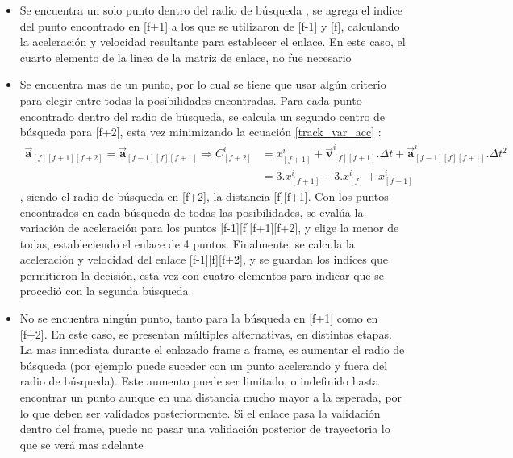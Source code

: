 \begin{itemize}
\item Se encuentra un solo punto dentro del radio de búsqueda , se agrega el indice del punto encontrado en [f+1] a los que se utilizaron de [f-1] y [f], calculando la aceleración y velocidad resultante para establecer el enlace. En este caso, el cuarto elemento de la linea de la matriz de enlace, no fue necesario 
\item Se encuentra mas de un punto, por lo cual se tiene que usar algún criterio para elegir entre todas la posibilidades encontradas. Para cada punto encontrado dentro del radio de búsqueda, se calcula un segundo centro de búsqueda para [f+2], esta vez minimizando la ecuación \ref{track_var_acc} :
\begin{equation}
\begin{split}
\boldsymbol{\overrightarrow{a}}_{[f][f+1][f+2]}=\boldsymbol{\overrightarrow{a}}_{[f-1][f][f+1]} \Rightarrow C_{[f+2]}^{i} &= x_{[f+1]}^{i} + \boldsymbol{\overrightarrow{v}}_{[f][f+1]}^{i}.\Delta{t} + \boldsymbol{\overrightarrow{a}}_{[f-1][f][f+1]}^{i}.\Delta{t}^2\\
&= 3.x_{[f+1]}^{i} - 3.x_{[f]}^{i} + x_{[f-1]}^{i}\end{split}
\label{centro_busqueda_f2}
\end{equation}
, siendo el radio de búsqueda en [f+2], la distancia [f][f+1]. Con los puntos encontrados en cada búsqueda de todas las posibilidades, se evalúa la variación de aceleración para los puntos [f-1][f][f+1][f+2], y elige la menor de todas, estableciendo el enlace de 4 puntos. Finalmente, se calcula la aceleración y velocidad del enlace [f-1][f][f+2], y se guardan los indices que permitieron la decisión, esta vez con cuatro elementos para indicar que se procedió con la segunda búsqueda.
\item No se encuentra ningún punto, tanto para la búsqueda en [f+1] como en [f+2]. En este caso, se presentan múltiples alternativas, en distintas etapas. La mas inmediata durante el enlazado frame a frame, es aumentar el radio de búsqueda (por ejemplo puede suceder con un punto acelerando y fuera del radio de búsqueda). Este aumento puede ser limitado, o indefinido hasta encontrar un punto aunque en una distancia mucho mayor a la esperada, por lo que deben ser validados posteriormente. Si el enlace pasa la validación dentro del frame, puede no pasar una validación posterior de trayectoria lo que se verá mas adelante
\end{itemize}




